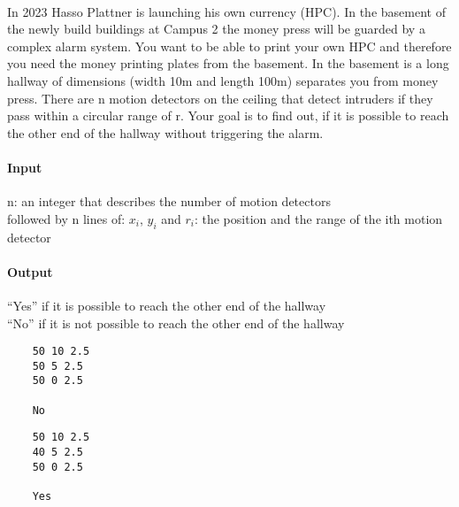 



\makeheader

\\
In 2023 Hasso Plattner is launching his own currency (HPC). In the basement of the newly build buildings at Campus 2 the money press will be guarded by a complex alarm system. 
You want to be able to print your own HPC and therefore you need the money printing plates from the basement. 
In the basement is a long hallway of dimensions (width 10m and length 100m) separates you from money press. There are n motion detectors on the ceiling that detect intruders if they pass within a circular range of r. 
Your goal is to find out, if it is possible to reach the other end of the hallway without triggering the alarm. 

\paragraph*{Input}
n: an integer that describes the number of motion detectors \\
followed by n lines of:
$x_i$, $y_i$ and $r_i$: the position and the range of the ith motion detector


\paragraph*{Output}
“Yes” if it is possible to reach the other end of the hallway \\
“No” if it is not possible to reach the other end of the hallway


\begin{samples}
  \begin{verbatim}
    50 10 2.5
    50 5 2.5
    50 0 2.5 
    
    No   
  \end{verbatim}
    

    
  \begin{verbatim}
    50 10 2.5
    40 5 2.5
    50 0 2.5 
    
    Yes  
  \end{verbatim}
\end{samples}

